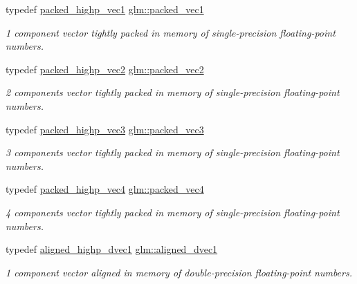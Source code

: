 \begin{DoxyCompactItemize}
typedef \hyperlink{group__gtc__type__aligned_ga0356e10a8b10f699cf7cf4308f449c83}{packed\+\_\+highp\+\_\+vec1} \hyperlink{group__gtc__type__aligned_ga1722068e0357aca709e5002f20cc043f}{glm\+::packed\+\_\+vec1}
\begin{DoxyCompactList}\small\item\em 1 component vector tightly packed in memory of single-\/precision floating-\/point numbers. \end{DoxyCompactList}\item 
typedef \hyperlink{group__gtc__type__aligned_ga15068ebf3dae2c205d90b1d36780bf9b}{packed\+\_\+highp\+\_\+vec2} \hyperlink{group__gtc__type__aligned_ga702841b8b37825c9a51d95bc0f7848b2}{glm\+::packed\+\_\+vec2}
\begin{DoxyCompactList}\small\item\em 2 components vector tightly packed in memory of single-\/precision floating-\/point numbers. \end{DoxyCompactList}\item 
typedef \hyperlink{group__gtc__type__aligned_ga6814dd861e658e724ce9e5e673a4486b}{packed\+\_\+highp\+\_\+vec3} \hyperlink{group__gtc__type__aligned_ga8e23eba0ebe21b912cd783f69fa3a99b}{glm\+::packed\+\_\+vec3}
\begin{DoxyCompactList}\small\item\em 3 components vector tightly packed in memory of single-\/precision floating-\/point numbers. \end{DoxyCompactList}\item 
typedef \hyperlink{group__gtc__type__aligned_gabbc42b2b5ad854c60821526c4e291161}{packed\+\_\+highp\+\_\+vec4} \hyperlink{group__gtc__type__aligned_gacb6d3e09d6aa52d954934e570b5c4fb1}{glm\+::packed\+\_\+vec4}
\begin{DoxyCompactList}\small\item\em 4 components vector tightly packed in memory of single-\/precision floating-\/point numbers. \end{DoxyCompactList}\item 
typedef \hyperlink{group__gtc__type__aligned_ga85671dcb7eef983b5035273fe78dd963}{aligned\+\_\+highp\+\_\+dvec1} \hyperlink{group__gtc__type__aligned_ga81fe4410dc880770293c53fcba83c9e4}{glm\+::aligned\+\_\+dvec1}
\begin{DoxyCompactList}\small\item\em 1 component vector aligned in memory of double-\/precision floating-\/point numbers. \end{DoxyCompactList}\item 

\end{DoxyCompactItemize}
